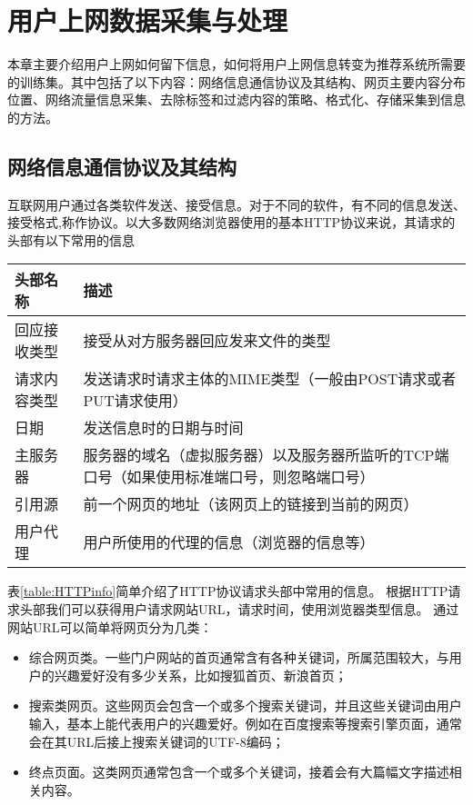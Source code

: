 \chapter{用户上网数据采集与处理}
本章主要介绍用户上网如何留下信息，如何将用户上网信息转变为推荐系统所需要的训练集。其中包括了以下内容：网络信息通信协议及其结构、网页主要内容分布位置、网络流量信息采集、去除标签和过滤内容的策略、格式化、存储采集到信息的方法。

\section{网络信息通信协议及其结构}
互联网用户通过各类软件发送、接受信息。对于不同的软件，有不同的信息发送、接受格式,称作协议。以大多数网络浏览器使用的基本HTTP协议来说，其请求的头部有以下常用的信息 \\
\begin{center}
\label{table:HTTPinfo}
\begin{tabular}{l|p{10cm}}
 \hline
头部名称 & 描述 \\ \hline
回应接收类型 & 接受从对方服务器回应发来文件的类型 \\ \hline
请求内容类型 & 发送请求时请求主体的MIME类型（一般由POST请求或者PUT请求使用） \\ \hline
日期 & 发送信息时的日期与时间 \\ \hline
主服务器 & 服务器的域名（虚拟服务器）以及服务器所监听的TCP端口号（如果使用标准端口号，则忽略端口号） \\ \hline
引用源 & 前一个网页的地址（该网页上的链接到当前的网页） \\ \hline
用户代理 & 用户所使用的代理的信息（浏览器的信息等） \\
\hline
\end{tabular}
\end{center}

表\ref{table:HTTPinfo}简单介绍了HTTP协议请求头部中常用的信息。
根据HTTP请求头部我们可以获得用户请求网站URL，请求时间，使用浏览器类型信息。
通过网站URL可以简单将网页分为几类：
\begin{itemize}
\item 综合网页类。一些门户网站的首页通常含有各种关键词，所属范围较大，与用户的兴趣爱好没有多少关系，比如搜狐首页、新浪首页；
\item 搜索类网页。这些网页会包含一个或多个搜索关键词，并且这些关键词由用户输入，基本上能代表用户的兴趣爱好。例如在百度搜索等搜索引擎页面，通常会在其URL后接上搜索关键词的UTF-8编码；
\item 终点页面。这类网页通常包含一个或多个关键词，接着会有大篇幅文字描述相关内容。
\end{itemize}

